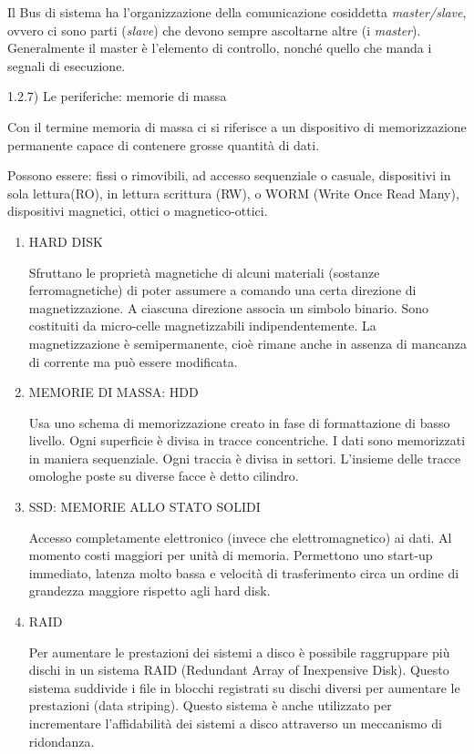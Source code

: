 \documentclass[
  paper=a4,
  oneside  ,captions=tableheading
]{scrbook}
\begin{document}
Il Bus di sistema ha l'organizzazione della comunicazione cosiddetta
\emph{master/slave}, ovvero ci sono parti (\emph{slave}) che devono
sempre ascoltarne altre (i \emph{master}). Generalmente il master è
l'elemento di controllo, nonché quello che manda i segnali di
esecuzione.

1.2.7) Le periferiche: memorie di massa

Con il termine memoria di massa ci si riferisce a un dispositivo di
memorizzazione permanente capace di contenere grosse quantità di dati.

Possono essere: fissi o rimovibili, ad accesso sequenziale o casuale,
dispositivi in sola lettura(RO), in lettura scrittura (RW), o WORM
(Write Once Read Many), dispositivi magnetici, ottici o
magnetico-ottici.

\begin{enumerate}
\def\labelenumi{\arabic{enumi}.}
\item
  HARD DISK

  Sfruttano le proprietà magnetiche di alcuni materiali (sostanze
  ferromagnetiche) di poter assumere a comando una certa direzione di
  magnetizzazione. A ciascuna direzione associa un simbolo binario. Sono
  costituiti da micro-celle magnetizzabili indipendentemente. La
  magnetizzazione è semipermanente, cioè rimane anche in assenza di
  mancanza di corrente ma può essere modificata.
\item
  MEMORIE DI MASSA: HDD

  Usa uno schema di memorizzazione creato in fase di formattazione di
  basso livello. Ogni superficie è divisa in tracce concentriche. I dati
  sono memorizzati in maniera sequenziale. Ogni traccia è divisa in
  settori. L'insieme delle tracce omologhe poste su diverse facce è
  detto cilindro.
\item
  SSD: MEMORIE ALLO STATO SOLIDI

  Accesso completamente elettronico (invece che elettromagnetico) ai
  dati. Al momento costi maggiori per unità di memoria. Permettono uno
  start-up immediato, latenza molto bassa e velocità di trasferimento
  circa un ordine di grandezza maggiore rispetto agli hard disk.
\item
  RAID

  Per aumentare le prestazioni dei sistemi a disco è possibile
  raggruppare più dischi in un sistema RAID (Redundant Array of
  Inexpensive Disk). Questo sistema suddivide i file in blocchi
  registrati su dischi diversi per aumentare le prestazioni (data
  striping). Questo sistema è anche utilizzato per incrementare
  l'affidabilità dei sistemi a disco attraverso un meccanismo di
  ridondanza.
\end{enumerate}
\end{document}
